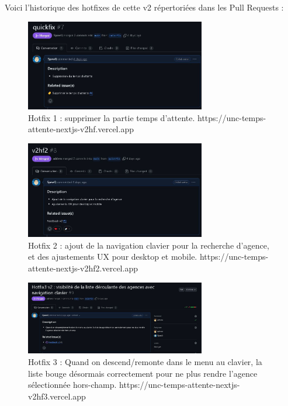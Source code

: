 \documentclass[12pt,a4paper]{report}
\begin{document}
\vspace{1cm}
Voici l'historique des hotfixes de cette v2 répertoriées dans les Pull Requests :
\vspace{1cm}

\begin{figure}[h] %
    \centering
    \includegraphics[width=0.7\textwidth]{ressources_rapport/extrait_pr_7.JPG}
    \caption{Hotfix 1 : supprimer la partie temps d'attente. https://unc-temps-attente-nextjs-v2hf.vercel.app}
\end{figure}

\begin{figure}[h] %
    \centering
    \includegraphics[width=0.7\textwidth]{ressources_rapport/extrait_pr_8.JPG}
    \caption{Hotfix 2 : ajout de la navigation clavier pour la recherche d'agence, et des ajustements UX pour desktop et mobile. https://unc-temps-attente-nextjs-v2hf2.vercel.app}
\end{figure}

\begin{figure}[h] %
    \centering
    \includegraphics[width=0.7\textwidth]{ressources_rapport/extrait_pr_9.JPG}
    \caption{Hotfix 3 : Quand on descend/remonte dans le menu au clavier, la liste bouge désormais correctement pour ne plus rendre l'agence sélectionnée hors-champ. https://unc-temps-attente-nextjs-v2hf3.vercel.app}
\end{figure}
\end{document}
